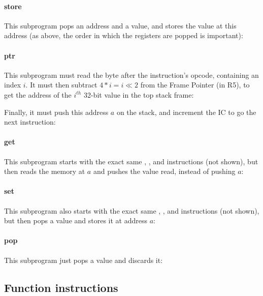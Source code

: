 
\paragraph{store} This subprogram pops an address and a value, and stores the
value at this address (as above, the order in which the registers are popped is
important):


\paragraph{ptr} This subprogram must read the byte after the instruction's
opcode, containing an index $i$. It must then subtract $4*i=i \ll 2$ from the
Frame Pointer (in R5), to get the address of the $i^{th}$ 32-bit value in the
top stack frame:


\noindent Finally, it must push this address $a$ on the stack, and increment
the IC to go the next instruction:


\paragraph{get} This subprogram starts with the exact same ,
, and  instructions (not shown), but then reads the memory at
$a$ and pushes the value read, instead of pushing $a$:


\paragraph{set} This subprogram also starts with the exact same ,
, and  instructions (not shown), but then pops a value and
stores it at address $a$:


\paragraph{pop} This subprogram just pops a value and discards it:


\subsection{Function instructions}

